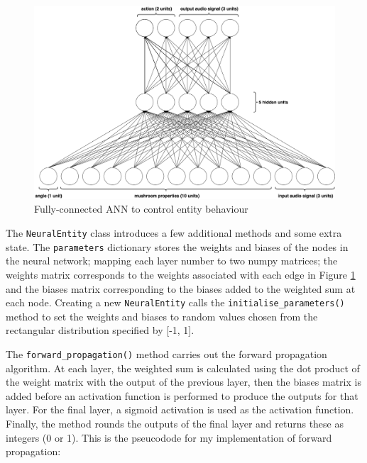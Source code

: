 \documentclass[12pt,a4paper,twoside,openright]{report}
\begin{document}
\begin{figure}[t]
  \centering
  \includegraphics[width=.9\linewidth]{figs/fullneural}
  \caption{Fully-connected ANN to control entity behaviour}
  \label{fig:fullneural}
\end{figure}

The \texttt{NeuralEntity} class introduces a few additional methods and some extra state. The \texttt{parameters} dictionary stores the weights and biases of the nodes in the neural network; mapping each layer number to two numpy matrices; the weights matrix corresponds to the weights associated with each edge in Figure \ref{fig:fullneural} and the biases matrix corresponding to the biases added to the weighted sum at each node. Creating a new \texttt{NeuralEntity} calls the \texttt{initialise\_parameters()} method to set the weights and biases to random values chosen from the rectangular distribution specified by [-1, 1].

The \texttt{forward\_propagation()} method carries out the forward propagation algorithm. At each layer, the weighted sum is calculated using the dot product of the weight matrix with the output of the previous layer, then the biases matrix is added before an activation function is performed to produce the outputs for that layer. For the final layer, a sigmoid activation is used as the activation function. Finally, the method rounds the outputs of the final layer and returns these as integers (0 or 1). This is the pseucodode for my implementation of forward propagation: 
\end{document}
